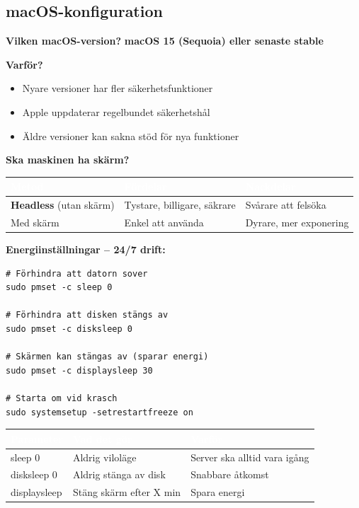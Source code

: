 \documentclass[12pt,a4paper,swedish]{article}
\begin{document}
\subsection{macOS-konfiguration}
\label{sec:macos}

\textbf{Vilken macOS-version?} \textbf{macOS 15 (Sequoia) eller senaste stable}

\bigskip

\textbf{Varför?}
\begin{itemize}
    \item Nyare versioner har fler säkerhetsfunktioner
    \item Apple uppdaterar regelbundet säkerhetshål
    \item Äldre versioner kan sakna stöd för nya funktioner
\end{itemize}

\bigskip

\textbf{Ska maskinen ha skärm?}

\begin{center}
\begin{tabular}{|p{5cm}|p{5cm}|p{5cm}|}
\hline
\rowcolor{dark}
\textcolor{white}{\textbf{Metod}} & \textcolor{white}{\textbf{Fördelar}} & \textcolor{white}{\textbf{Nackdelar}} \\
\hline
\textbf{Headless} (utan skärm) & Tystare, billigare, säkrare & Svårare att felsöka \\
\hline
Med skärm & Enkel att använda & Dyrare, mer exponering \\
\hline
\end{tabular}
\end{center}

\bigskip

\textbf{Energiinställningar – 24/7 drift:}

\begin{lstlisting}[style=latex]
# Förhindra att datorn sover
sudo pmset -c sleep 0

# Förhindra att disken stängs av
sudo pmset -c disksleep 0

# Skärmen kan stängas av (sparar energi)
sudo pmset -c displaysleep 30

# Starta om vid krasch
sudo systemsetup -setrestartfreeze on
\end{lstlisting}

\bigskip

\begin{table}[h!]
\centering
\begin{tabular}{|l|l|p{6cm}|}
\hline
\rowcolor{secondary}
\textcolor{white}{\textbf{Parameter}} & \textcolor{white}{\textbf{Vad det gör}} & \textcolor{white}{\textbf{Varför}} \\
\hline
sleep 0 & Aldrig viloläge & Server ska alltid vara igång \\
\hline
disksleep 0 & Aldrig stänga av disk & Snabbare åtkomst \\
\hline
displaysleep & Stäng skärm efter X min & Spara energi \\
\hline
\end{tabular}
\end{table}
\end{document}
